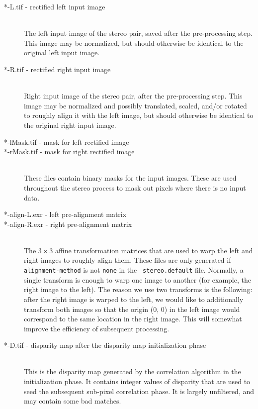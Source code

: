\begin{description}
\item[*-L.tif - \textnormal{rectified left input image}] \hfill \\
  The left input image of the stereo pair, saved after the
  pre-processing step.  This image may be normalized, but should
  otherwise be identical to the original left input image.

\item[*-R.tif - \textnormal{rectified right input image}] \hfill \\
  Right input image of the stereo pair, after the pre-processing
  step.  This image may be normalized and possibly
    translated, scaled, and/or rotated to roughly align it with the left
    image, but should otherwise be identical to the original right
  input image.

\item[*-lMask.tif \textnormal{- mask for left rectified image}]
\item[*-rMask.tif \textnormal{- mask for right rectified image}] \hfill \\
  These files contain binary masks for the input images.  These are
  used throughout the stereo process to mask out pixels where there is
  no input data.

\item[*-align-L.exr \textnormal{- left pre-alignment matrix}]
\item[*-align-R.exr \textnormal{- right pre-alignment matrix}] \hfill \\
 The $3 \times 3$ affine transformation matrices that are used to warp
 the left and right images to roughly align them. These files are only
 generated if \texttt{alignment-method} is not \texttt{none} in the {\tt
 stereo.default} file. Normally, a single transform is enough to warp one
 image to another (for example, the right image to the left). The reason
 we use two transforms is the following: after the right image is warped
 to the left, we would like to additionally transform both images so that
 the origin (0, 0) in the left image would correspond to the same
 location in the right image. This will somewhat improve the efficiency
 of subsequent processing.

\item[*-D.tif \textnormal{- disparity map after the disparity map initialization phase}] \hfill \\
  This is the disparity map generated by the correlation algorithm in
  the initialization phase.  It contains integer values of disparity
  that are used to seed the subsequent sub-pixel correlation phase.
  It is largely unfiltered, and may contain some bad matches.


\end{description}
